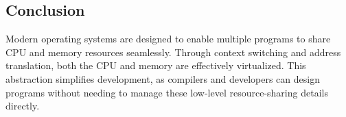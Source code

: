\subsection{Conclusion}
Modern operating systems are designed to enable multiple programs to share CPU and memory resources seamlessly. Through context switching and address translation, both the CPU and memory are effectively virtualized. This abstraction simplifies development, as compilers and developers can design programs without needing to manage these low-level resource-sharing details directly.


